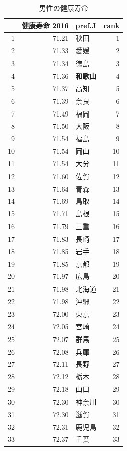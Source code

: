 \begin{table}[ht]
\centering
\footnotesize
\caption{男性の健康寿命}
\begin{tabular}{rrlr}
  \hline
 & 健康寿命 2016 & pref.J & rank \\
  \hline
1 & 71.21 & 秋田 &   1 \\
  2 & 71.33 & 愛媛 &   2 \\
  3 & 71.34 & 徳島 &   3 \\
  4 & 71.36 & \textbf{和歌山} &   4 \\
  5 & 71.37 & 高知 &   5 \\
  6 & 71.39 & 奈良 &   6 \\
  7 & 71.49 & 福岡 &   7 \\
  8 & 71.50 & 大阪 &   8 \\
  9 & 71.54 & 福島 &   9 \\
  10 & 71.54 & 岡山 &  10 \\
  11 & 71.54 & 大分 &  11 \\
  12 & 71.60 & 佐賀 &  12 \\
  13 & 71.64 & 青森 &  13 \\
  14 & 71.69 & 鳥取 &  14 \\
  15 & 71.71 & 島根 &  15 \\
  16 & 71.79 & 三重 &  16 \\
  17 & 71.83 & 長崎 &  17 \\
  18 & 71.85 & 岩手 &  18 \\
  19 & 71.85 & 京都 &  19 \\
  20 & 71.97 & 広島 &  20 \\
  21 & 71.98 & 北海道 &  21 \\
  22 & 71.98 & 沖縄 &  22 \\
  23 & 72.00 & 東京 &  23 \\
  24 & 72.05 & 宮崎 &  24 \\
  25 & 72.07 & 群馬 &  25 \\
  26 & 72.08 & 兵庫 &  26 \\
  27 & 72.11 & 長野 &  27 \\
  28 & 72.12 & 栃木 &  28 \\
  29 & 72.18 & 山口 &  29 \\
  30 & 72.30 & 神奈川 &  30 \\
  31 & 72.30 & 滋賀 &  31 \\
  32 & 72.31 & 鹿児島 &  32 \\
  33 & 72.37 & 千葉 &  33 \\

\end{tabular}
\end{table}
